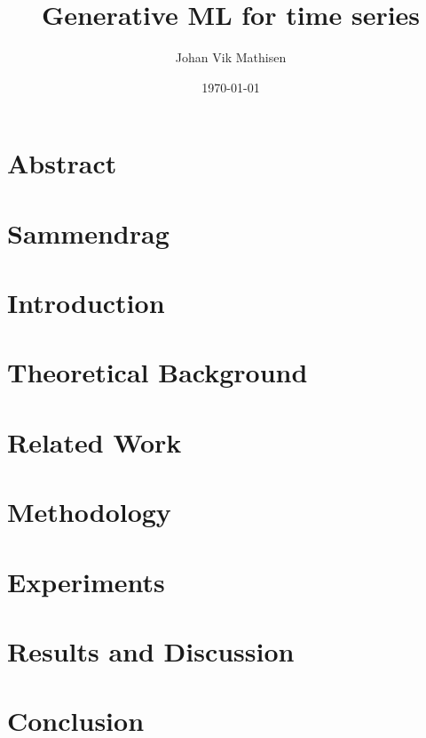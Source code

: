 \documentclass[british,titlepage]{ntnuthesis}
\title{Generative ML for time series}
\author{Johan Vik Mathisen}
\date{\today}
\begin{document}
\chapter*{Abstract}

\chapter*{Sammendrag}



%

\tableofcontents


\chapter{Introduction}


\chapter{Theoretical Background}


\chapter{Related Work}


\chapter{Methodology}


\chapter{Experiments}


\chapter{Results and Discussion}


\chapter{Conclusion}


\chapter*{\bibname}
\printbibliography[heading=none]



\appendix

\end{document}
